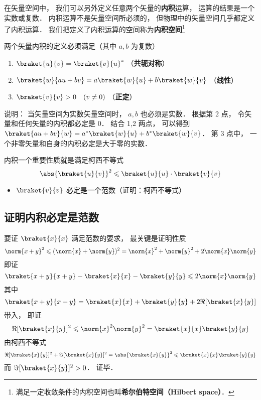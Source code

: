 

在矢量空间中， 我们可以另外定义任意两个矢量的\textbf{内积}运算， 运算的结果是一个实数或复数． 内积运算不是矢量空间所必须的， 但物理中的矢量空间几乎都定义了内积运算． 我们把定义了内积运算的空间称为\textbf{内积空间}\footnote{满足一定收敛条件的内积空间也叫\textbf{希尔伯特空间（Hilbert space）}．}

两个矢量内积的定义必须满足（其中 $a, b$ 为复数）
\begin{enumerate}
\item $\braket{u}{v} = \braket{v}{u}^*$ （\textbf{共轭对称}）
\item $\braket{w}{a u + b v} = a\braket{w}{u} + b\braket{w}{v}$ （\textbf{线性}）
\item $\braket{v}{v} > 0 \quad (v \ne 0)$  （\textbf{正定}）
\end{enumerate}

说明： 当矢量空间为实数矢量空间时， $a, b$ 也必须是实数． 根据第 2 点， 令矢量和任何矢量的内积都必定是 0． 结合 1,2 两点， 可以得到 $\braket{a u + b v}{w} = a^*\braket{w}{u} + b^*\braket{w}{v}$．
第 3 点中， 一个非零矢量和自身的内积必定是大于零的实数．

内积一个重要性质就是满足柯西不等式
\begin{equation}
\abs{\braket{u}{v}}^2 \leqslant \braket{u}{u} \cdot \braket{v}{v}
\end{equation}

\begin{itemize}
\item $\braket{v}{v}$ 必定是一个范数（证明：柯西不等式）
\end{itemize}

\subsection{证明内积必定是范数}
要证 $\braket{x}{x}$ 满足范数的要求， 最关键是证明性质
\begin{equation}
\norm{x+y}^2 \leqslant (\norm{x} + \norm{y})^2 = \norm{x}^2 + \norm{y}^2 + 2\norm{x}\norm{y}
\end{equation}
即证
\begin{equation}
\braket{x+y}{x+y} - \braket{x}{x} - \braket{y}{y} \leqslant 2\norm{x}\norm{y}
\end{equation}
其中
\begin{equation}
\braket{x+y}{x+y} = \braket{x}{x} + \braket{y}{y} + 2\Re[{\braket{x}{y}}]
\end{equation}
带入， 即证
\begin{equation}
\Re[{\braket{x}{y}}]^2 \leqslant \norm{x}^2\norm{y}^2 = \braket{x}{x}\braket{y}{y}
\end{equation}
由柯西不等式
\begin{equation}
\Re[\braket{x}{y}]^2 + \Im[\braket{x}{y}]^2 = \abs{\braket{x}{y}}^2 \leqslant \braket{x}{x}\braket{y}{y}
\end{equation}
而 $\Im[\braket{x}{y}]^2 > 0$． 证毕．
